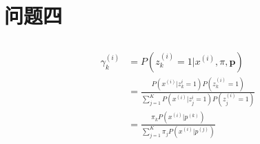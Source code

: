 \documentclass[12pt, a4paper]{article}
\begin{document}
\section{问题四}

\subsection{}

\begin{align*}
    \gamma_k^{(i)}&=P(z_k^{(i)}=1\vert x^{(i)},\pi,\mathbf{p})\\
    &=\frac{P(x^{(i)}\vert z_k^{i}=1)P(z_k^{(i)}=1)}{\sum_{j=1}^KP(x^{(i)}\vert z_j^{i}=1)P(z_j^{(i)}=1)}\\
    &=\frac{\pi_k P(x^{(i)}\vert p^{(k)})}{\sum_{j=1}^K\pi_j P(x^{(i)}\vert p^{(j)})}
\end{align*}

\subsection{}
\end{document}
